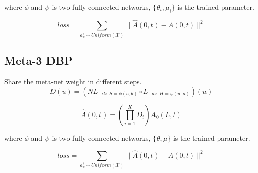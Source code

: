 where $\phi$ and $\psi$ is two fully connected networks, $\{\theta_i,\mu_i\}$ is the trained parameter. 

$$
loss = \sum_{a_k^i \sim Uniform(\mathcal{X})} \|\hat{A}(0,t) - A(0,t)\|^2
$$

\subsection{Meta-3 DBP}
Share the meta-net weight in different steps.
$$
D(u) = \left(NL_{-dz,S=\phi(u;\theta)} \circ L_{-dz,H=\psi(u;\mu)}\right) (u)
$$

$$
\hat{A}(0,t) = \left(\prod_{i=1}^{K} D_i\right)A_0(L,t)
$$

where $\phi$ and $\psi$ is two fully connected networks, $\{\theta,\mu\}$ is the trained parameter. 

$$
loss = \sum_{a_k^i \sim Uniform(\mathcal{X})} \|\hat{A}(0,t) - A(0,t)\|^2
$$


